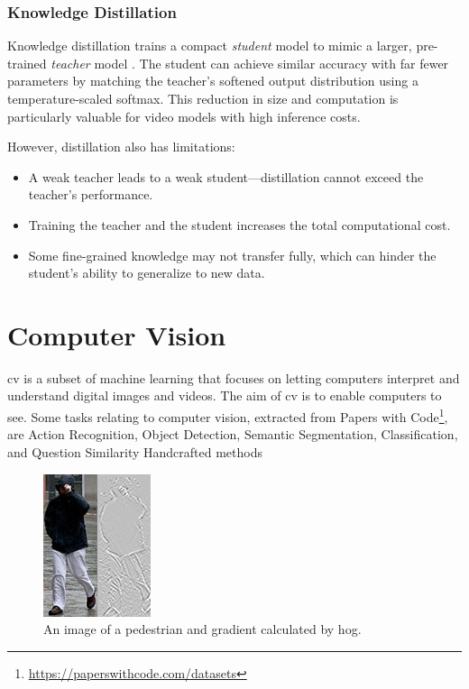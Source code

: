 \subsubsection{Knowledge Distillation}
\label{sssec:knowledge_distillation}

Knowledge distillation trains a compact \emph{student} model to mimic a larger, pre-trained \emph{teacher} model \cite{denize_comedian_2024, li_videomamba_2024, bose_soccerkdnet_2023}. The student can achieve similar accuracy with far fewer parameters by matching the teacher's softened output distribution using a temperature-scaled softmax. This reduction in size and computation is particularly valuable for video models with high inference costs.

However, distillation also has limitations:
\begin{itemize}
    \item A weak teacher leads to a weak student—distillation cannot exceed the teacher's performance.
    \item Training the teacher and the student increases the total computational cost.
    \item Some fine-grained knowledge may not transfer fully, which can hinder the student's ability to generalize to new data.
\end{itemize}


\section{Computer Vision} 
\label{sec:computer_vision}

\acrfull{cv} is a subset of machine learning that focuses on letting computers interpret and understand digital images and videos. The aim of \acrlong{cv} is to enable computers to see. Some tasks relating to computer vision, extracted from Papers with Code\footnote{\url{https://paperswithcode.com/datasets}}, are Action Recognition, Object Detection, Semantic Segmentation, Classification, and Question Similarity {Handcrafted methods}

\begin{figure}
    \centering
    \includegraphics[width=0.5\linewidth]{figures/Pedestrian_gradient.jpg}
    \caption{An image of a pedestrian and gradient calculated by \acrshort{hog}.}
    \label{fig:pedestrian_gradient}
\end{figure}


